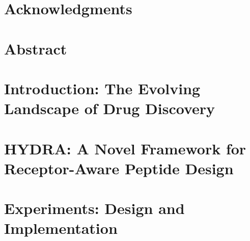 \documentclass[11pt]{book}
\renewcommand{\baselinestretch}{1.2}
\begin{document}



\newpage
\thispagestyle{empty}
\renewcommand{\thesisdedication}{{\large Copyright \copyright~~Vishva Saravanan Ramasubramanian, 2024\\}{\large All Rights Reserved\\}}
\thesisdedicationpage



\newpage
\thispagestyle{empty}
\renewcommand{\thesisdedication}{\large To my family and friends.}
\thesisdedicationpage

\mastersthesis
\renewcommand{\baselinestretch}{1.5}

\chapter*{Acknowledgments}
\label{ch:ack}


\chapter*{Abstract}
\label{ch:abstract}


\tableofcontents
\listoffigures
\listoftables

\chapter{Introduction: The Evolving Landscape of Drug Discovery}
\label{ch:intro}



\chapter{HYDRA: A Novel Framework for Receptor-Aware Peptide Design}
\label{ch:chap2}



\chapter{Experiments: Design and Implementation}
\label{ch:chap3}

\end{document}
